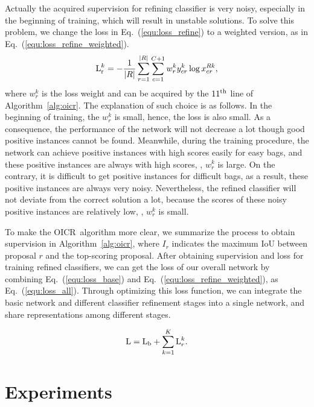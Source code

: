 \documentclass[10pt,twocolumn,letterpaper]{article}
\def\methodname{OICR}
\begin{document}
Actually the acquired supervision for refining classifier is very noisy, especially in the beginning of training, which will result in unstable solutions.
To solve this problem, we change the loss in Eq.~(\ref{equ:loss_refine}) to a weighted version, as in Eq.~(\ref{equ:loss_refine_weighted}).
\begin{equation}
\label{equ:loss_refine_weighted}
   \textup{L}^{k}_\textup{r} = -\frac{1}{|R|}\mathop{\sum} \limits_{r=1}^{|R|} \sum_{c=1}^{C+1} w^{k}_{r} y^{k}_{cr} \log x^{Rk}_{cr},
\end{equation}
where $w^{k}_{r}$ is the loss weight and can be acquired by the $11^{\textup{th}}$ line of Algorithm~\ref{alg:oicr}.
The explanation of such choice is as follows.
In the beginning of training, the $w^{k}_{r}$ is small, hence, the loss is also small.
As a consequence, the performance of the network will not decrease a lot though good positive instances cannot be found.
Meanwhile, during the training procedure, the network can achieve positive instances with high scores easily for easy bags, and these positive instances are always with high scores, \ie, $w^{k}_{r}$ is large.
On the contrary, it is difficult to get positive instances for difficult bags, as a result, these positive instances are always very noisy.
Nevertheless, the refined classifier will not deviate from the correct solution a lot, because the scores of these noisy positive instances are relatively low, \ie, $w^{k}_{r}$ is small.

To make the \methodname\ algorithm more clear, we summarize the process to obtain supervision in Algorithm~\ref{alg:oicr}, where $I_{r}$ indicates the maximum IoU between proposal $r$ and the top-scoring proposal.
After obtaining supervision and loss for training refined classifiers, we can get the loss of our overall network by combining Eq.~(\ref{equ:loss_base}) and Eq.~(\ref{equ:loss_refine_weighted}), as Eq.~(\ref{equ:loss_all}).
Through optimizing this loss function, we can integrate the basic network and different classifier refinement stages into a single network, and share representations among different stages.

\begin{equation}
\label{equ:loss_all}
   \textup{L} = \textup{L}_{\textup{b}} + \mathop{\sum} \limits_{k=1}^{K} \textup{L}^{k}_{r}.
\end{equation}



\section{Experiments}
\label{sec:exp}
\end{document}
